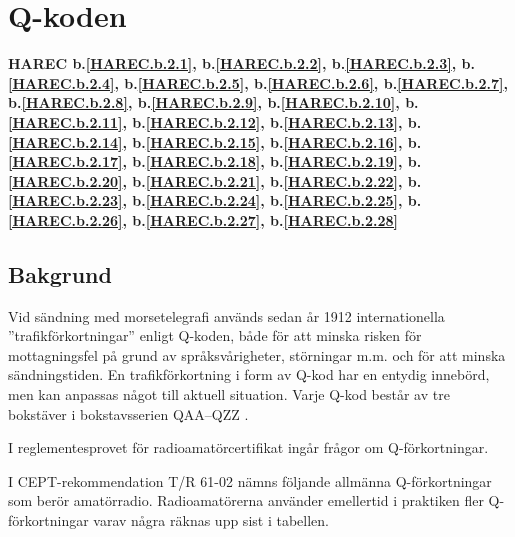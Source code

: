 \section{Q-koden}
\label{q-koden}
\textbf{
HAREC b.\ref{HAREC.b.2.1}\label{myHAREC.b.2.1},
 b.\ref{HAREC.b.2.2}\label{myHAREC.b.2.2},
 b.\ref{HAREC.b.2.3}\label{myHAREC.b.2.3},
 b.\ref{HAREC.b.2.4}\label{myHAREC.b.2.4},
 b.\ref{HAREC.b.2.5}\label{myHAREC.b.2.5},
 b.\ref{HAREC.b.2.6}\label{myHAREC.b.2.6},
 b.\ref{HAREC.b.2.7}\label{myHAREC.b.2.7},
 b.\ref{HAREC.b.2.8}\label{myHAREC.b.2.8},
 b.\ref{HAREC.b.2.9}\label{myHAREC.b.2.9},
 b.\ref{HAREC.b.2.10}\label{myHAREC.b.2.10},
 b.\ref{HAREC.b.2.11}\label{myHAREC.b.2.11},
 b.\ref{HAREC.b.2.12}\label{myHAREC.b.2.12},
 b.\ref{HAREC.b.2.13}\label{myHAREC.b.2.13},
 b.\ref{HAREC.b.2.14}\label{myHAREC.b.2.14},
 b.\ref{HAREC.b.2.15}\label{myHAREC.b.2.15},
 b.\ref{HAREC.b.2.16}\label{myHAREC.b.2.16},
 b.\ref{HAREC.b.2.17}\label{myHAREC.b.2.17},
 b.\ref{HAREC.b.2.18}\label{myHAREC.b.2.18},
 b.\ref{HAREC.b.2.19}\label{myHAREC.b.2.19},
 b.\ref{HAREC.b.2.20}\label{myHAREC.b.2.20},
 b.\ref{HAREC.b.2.21}\label{myHAREC.b.2.21},
 b.\ref{HAREC.b.2.22}\label{myHAREC.b.2.22},
 b.\ref{HAREC.b.2.23}\label{myHAREC.b.2.23},
 b.\ref{HAREC.b.2.24}\label{myHAREC.b.2.24},
 b.\ref{HAREC.b.2.25}\label{myHAREC.b.2.25},
 b.\ref{HAREC.b.2.26}\label{myHAREC.b.2.26},
 b.\ref{HAREC.b.2.27}\label{myHAREC.b.2.27},
 b.\ref{HAREC.b.2.28}\label{myHAREC.b.2.28}
}

\subsection{Bakgrund}

Vid sändning med morsetelegrafi används sedan år 1912 internationella
''trafikförkortningar'' enligt Q-koden, både för att minska risken för
mottagningsfel på grund av språksvårigheter, störningar m.m. och för
att minska sändningstiden. En trafikförkortning i form av Q-kod har en
entydig innebörd, men kan anpassas något till aktuell situation. Varje
Q-kod består av tre bokstäver i bokstavsserien QAA--QZZ \cite[M.1172]{ITU-RR}.

I reglementesprovet för radioamatörcertifikat ingår frågor om Q-förkortningar.

I CEPT-rekommendation T/R 61-02 \cite[Annex 6]{TR6102} nämns följande allmänna
Q-förkortningar som berör amatörradio. Radioamatörerna använder emellertid i
praktiken fler Q-förkortningar varav några räknas upp sist i tabellen.

